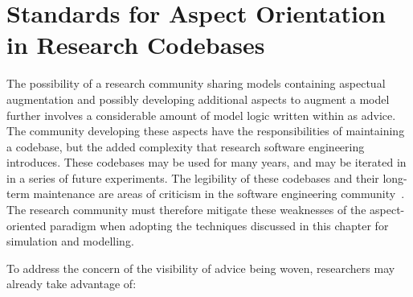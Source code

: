 \section{Standards for Aspect Orientation in Research
Codebases}
\label{future_work_standard_aosm_techniques}




The possibility of a research community sharing models containing aspectual
augmentation and possibly developing additional aspects to augment a model
further involves a considerable amount of model logic written within as advice.
The community developing these aspects have the responsibilities of maintaining
a codebase, but the added complexity that research software engineering
introduces. These codebases may be used for many years, and may be iterated in
in a series of future experiments. The legibility of these codebases and their
long-term maintenance are areas of criticism in the software engineering
community~\cite{steimann06paradoxical,przybylek2010wrong,Constantinides04aopconsidered}.
The research community must therefore mitigate these weaknesses of the
aspect-oriented paradigm when adopting the techniques discussed in this chapter
for simulation and modelling.

To address the concern of the visibility of advice being woven, researchers may
already take advantage of:


